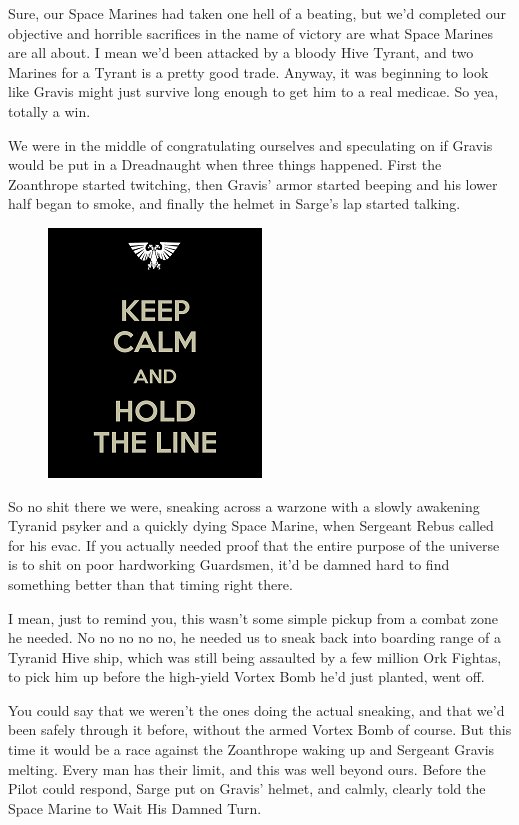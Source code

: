 Sure, our Space Marines had taken one hell of a beating, but we'd completed our objective and horrible sacrifices in the name of victory are what Space Marines are all about. 
 I mean we'd been attacked by a bloody Hive Tyrant, and two Marines for a Tyrant is a pretty good trade. 
Anyway, it was beginning to look like Gravis might just survive long enough to get him to a real medicae. 
So yea, totally a win.

We were in the middle of congratulating ourselves and speculating on if Gravis would be put in a Dreadnaught when three things happened. 
First the Zoanthrope started twitching, then Gravis' armor started beeping and his lower half began to smoke, and finally the helmet in Sarge's lap started talking.
\begin{figure}
	\begin{center}
		\includegraphics[width=\figwidth]{pics/12/59.png}
	\end{center}
\end{figure}
So no shit there we were, sneaking across a warzone with a slowly awakening Tyranid psyker and a quickly dying Space Marine, when Sergeant Rebus called for his evac. 
If you actually needed proof that the entire purpose of the universe is to shit on poor hardworking Guardsmen, it'd be damned hard to find something better than that timing right there. 


I mean, just to remind you, this wasn't some simple pickup from a combat zone he needed. 
No no no no no, he needed us to sneak back into boarding range of a Tyranid Hive ship, which was still being assaulted by a few million Ork Fightas, to pick him up before the high-yield Vortex Bomb he'd just planted, went off. 


You could say that we weren't the ones doing the actual sneaking, and that we'd been safely through it before, without the armed Vortex Bomb of course. 
But this time it would be a race against the Zoanthrope waking up and Sergeant Gravis melting. 
Every man has their limit, and this was well beyond ours. 
Before the Pilot could respond, Sarge put on Gravis' helmet, and calmly, clearly told the Space Marine to Wait His Damned Turn. 


